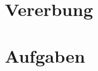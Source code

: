 \documentclass{lehramt-informatik-haupt}
\begin{document}

\chapter{Vererbung}


\chapter{Aufgaben}

\literatur
\end{document}
